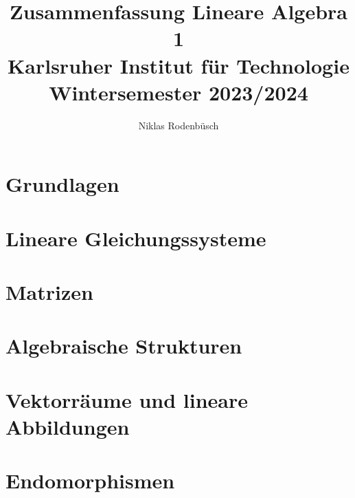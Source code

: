 \documentclass[ngerman,12pt,a4paper
,pdftex]{article}
\title{Zusammenfassung Lineare Algebra 1 \\[1ex] \large Karlsruher Institut für Technologie \\[1ex] Wintersemester 2023/2024}
\author{Niklas Rodenbüsch}
\date{}
\theoremstyle{nodot}
\theoremstyle{nodot}
\begin{document}
    \pagestyle{fancy}
    \fancyhf{}
    \fancyhead[L]{\nouppercase{\leftmark}}
    \fancyfoot[C]{\thepage}
    \renewcommand{\headrulewidth}{0.2pt}

    \maketitle
    \newpage
    

    \begin{onehalfspace}
        \setcounter{savepage}{\value{page}}

        \section{Grundlagen}
        
        \section{Lineare Gleichungssysteme}
        
        \section{Matrizen}
        
        \section{Algebraische Strukturen}
        
        \section{Vektorräume und lineare Abbildungen}
        
        \section{Endomorphismen}
        
    \end{onehalfspace}

    
\end{document}
